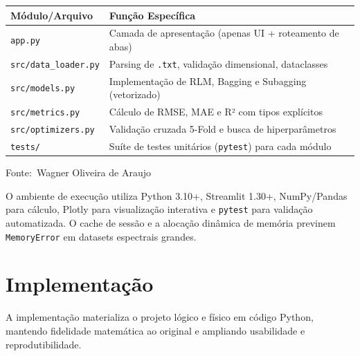\documentclass[12pt,a4paper]{article}
\newcommand{\oautor}{Wagner Oliveira de Araujo}
\begin{document}
\begin{quadro}[ht]
\begin{center}
\small
\caption{Estrutura modular e responsabilidades}
\label{quadro:estrutura}
\begin{threeparttable}
\begin{tabularx}{\textwidth}{|l|X|} \hline
\textbf{Módulo/Arquivo} & \textbf{Função Específica} \\ \hline
\texttt{app.py} & Camada de apresentação (apenas UI + roteamento de abas) \\ \hline
\texttt{src/data\_loader.py} & Parsing de \texttt{.txt}, validação dimensional, dataclasses \\ \hline
\texttt{src/models.py} & Implementação de RLM, Bagging e Subagging (vetorizado) \\ \hline
\texttt{src/metrics.py} & Cálculo de RMSE, MAE e R² com tipos explícitos \\ \hline
\texttt{src/optimizers.py} & Validação cruzada 5-Fold e busca de hiperparâmetros \\ \hline
\texttt{tests/} & Suíte de testes unitários (\texttt{pytest}) para cada módulo \\ \hline
\end{tabularx}
\begin{tablenotes}[flushleft]
\footnotesize
\item Fonte:~\oautor
\end{tablenotes}
\end{threeparttable}
\end{center}
\end{quadro}

O ambiente de execução utiliza Python 3.10+, Streamlit 1.30+, NumPy/Pandas para cálculo, Plotly para visualização interativa e \texttt{pytest} para validação automatizada. O cache de sessão e a alocação dinâmica de memória previnem \texttt{MemoryError} em datasets espectrais grandes.

\section{Implementação}

A implementação materializa o projeto lógico e físico em código Python, mantendo fidelidade matemática ao original e ampliando usabilidade e reprodutibilidade.
\end{document}
